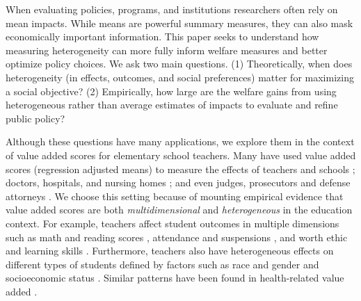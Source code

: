 \documentclass[12pt]{article}
\theoremstyle{definition}
\theoremstyle{definition}
\theoremstyle{definition}
\theoremstyle{definition}
\begin{document}
When evaluating policies, programs, and institutions researchers often rely on mean impacts. While means are powerful summary measures, they can also mask economically important information. This paper seeks to understand how measuring heterogeneity can more fully inform welfare measures and better optimize policy choices. We ask two main questions. (1) Theoretically, when does heterogeneity (in effects, outcomes, and social preferences) matter for maximizing a social objective? (2) Empirically, how large are the welfare gains from using heterogeneous rather than average estimates of impacts to evaluate and refine public policy?


Although these questions have many applications, we explore them in the context of value added scores for elementary school teachers. Many have used value added scores (regression adjusted means) to measure the effects of teachers and schools \citep[see reviews in][]{angrist2022methods,bacher2022estimation}; doctors, hospitals, and nursing homes \citep{chandra2016health,doyle2019evaluating,hull2020hosptial,einav2022producing,chan2022selection}; and even judges, prosecutors and defense attorneys \citep{abrams2007luck,norris2019examiner,harrington2023prosecutor}. We choose this setting because of mounting empirical evidence that value added scores are both \textit{multidimensional} and \textit{heterogeneous} in the education context. For example, teachers affect student outcomes in multiple dimensions such as math and reading scores \citep{condie2014teacher}, attendance and suspensions \citep{jackson2018test}, and worth ethic and learning skills \citep{pope2017multidimensional}. Furthermore, teachers also have heterogeneous effects on different types of students defined by factors such as race and gender \citep[e.g.,][]{dee2005teacher,delhommer2019highschool,Delgado2020} and socioeconomic status \citep{bates2022teacher}. Similar patterns have been found in health-related value added \citep[e.g.,][]{hull2020hosptial,amyspaperwhenitcomesout}. 
\end{document}
